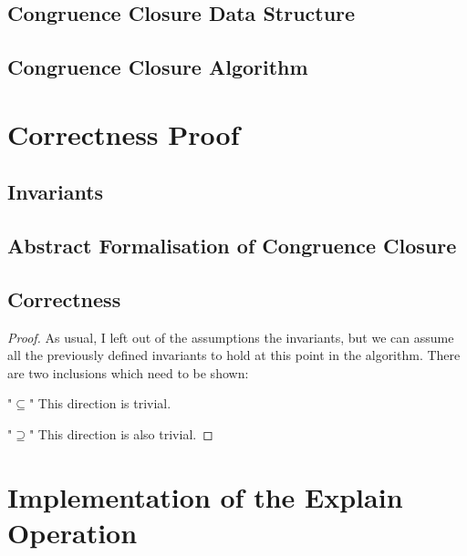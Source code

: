 \subsection{Congruence Closure Data Structure}

\subsection{Congruence Closure Algorithm}

\section{Correctness Proof}

\subsection{Invariants}

\subsection{Abstract Formalisation of Congruence Closure}

\subsection{Correctness}

\begin{proof}
As usual, I left out of the assumptions the invariants, but we can assume all the previously defined invariants to hold at this point in the algorithm. 
There are two inclusions which need to be shown:

"$\subseteq$" This direction is trivial.

"$\supseteq$" This direction is also trivial.

\end{proof}

\section{Implementation of the Explain Operation}
